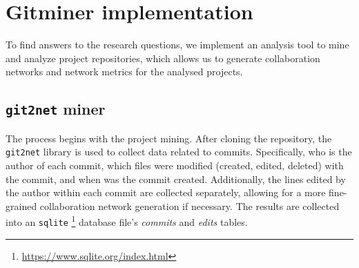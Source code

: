 

\section{Gitminer implementation}
To find answers to the research questions, we implement an analysis tool to mine and analyze project repositories, which allows us to generate collaboration networks and network metrics for the analysed projects. \\

\subsection{\texttt{git2net} miner}
The process begins with the project mining. After cloning the repository, the \texttt{git2net} \cite{goteAnalysingTimeStampedCoEditing2019} library is used to collect data related to commits. Specifically, who is the author of each commit, which files were modified (created, edited, deleted) with the commit, and when was the commit created. Additionally, the lines edited by the author within each commit are collected separately, allowing for a more fine-grained collaboration network generation if necessary. The results are collected into an \texttt{sqlite} \footnote{\url{https://www.sqlite.org/index.html}} database file's \textit{commits} and \textit{edits} tables. \\

